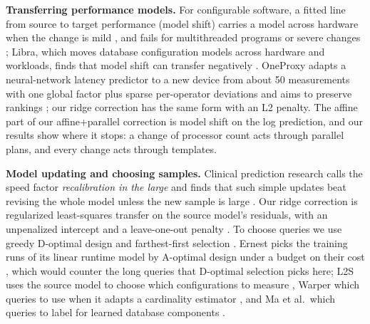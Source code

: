 \documentclass[sigconf,review]{acmart}
\begin{document}
\textbf{Transferring performance models.} For configurable software, a
fitted line from source to target performance (model shift) carries a
model across hardware when the change is mild
\cite{valov2017,jamshidi2017}, and fails for multithreaded programs or
severe changes \cite{valov2020,jamshidi2017,jamshidi2018}; Libra, which
moves database configuration models across hardware and workloads, finds
that model shift can transfer negatively \cite{nakamori2026libra}. OneProxy
adapts a neural-network latency predictor to a new device from about 50
measurements with one global factor plus sparse per-operator deviations and
aims to preserve rankings \cite{lu2021oneproxy}; our ridge correction has the same form with an L2
penalty. The affine part of our affine+parallel correction is model shift
on the log prediction, and our results show where it stops: a change of
processor count acts through parallel plans, and every change acts through
templates.

\textbf{Model updating and choosing samples.} Clinical prediction research
calls the speed factor \emph{recalibration in the large} and finds that such
simple updates beat revising the whole model unless the new sample is large
\cite{steyerberg2004,vergouwe2017}. Our ridge correction is regularized
least-squares transfer on the source model's residuals, with an
unpenalized intercept and a leave-one-out penalty
\cite{kuzborskij2013}. To choose queries we use greedy D-optimal design
\cite{wynn1970,mitchell1974} and farthest-first selection
\cite{gonzalez1985,sener2018}. Ernest picks the training runs of its linear
runtime model by A-optimal design under a budget on their cost
\cite{venkataraman2016ernest}, which would counter the long queries that
D-optimal selection picks here; L2S uses the source model to choose which
configurations to measure \cite{jamshidi2018}, Warper which queries to use
when it adapts a cardinality estimator \cite{li2022warper}, and Ma et al.\
which queries to label for learned database components
\cite{ma2020active}.

\raggedbottom
\end{document}
